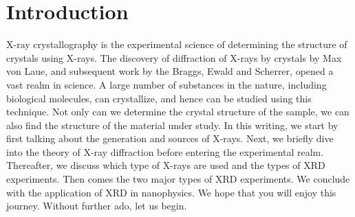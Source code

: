 \section{Introduction}

X-ray crystallography is the experimental science of determining the structure of crystals using X-rays. The discovery of diffraction of X-rays by crystals by Max von Laue, and subsequent work by the Braggs, Ewald and Scherrer, opened a vast realm in science. A large number of substances in the nature, including biological molecules, can crystallize, and hence can be studied using this technique. Not only can we determine the crystal structure of the sample, we can also find the structure of the material under study. In this writing, we start by first talking about the generation and sources of X-rays. Next, we briefly dive into the theory of X-ray diffraction before entering the experimental realm. Thereafter, we discuss which type of X-rays are used and the types of XRD experiments. Then comes the two major types of XRD experiments. We conclude with the application of XRD in nanophysics. We hope that you will enjoy this journey. Without further ado, let us begin.